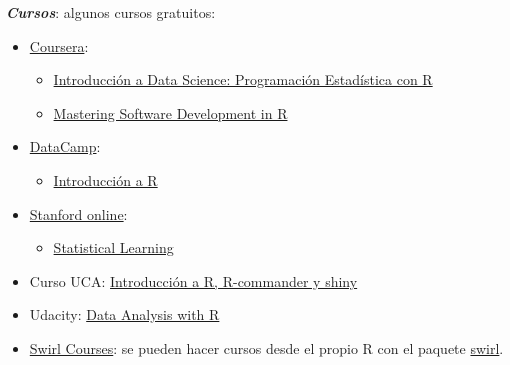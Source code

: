 \documentclass[]{book}
\providecommand{\tightlist}{%
  \setlength{\itemsep}{0pt}\setlength{\parskip}{0pt}}
\begin{document}
\textbf{\emph{Cursos}}: algunos cursos gratuitos:

\begin{itemize}
\item
  \href{https://www.coursera.org/}{Coursera}:

  \begin{itemize}
  \item
    \href{https://www.coursera.org/learn/intro-data-science-programacion-estadistica-r}{Introducción
    a Data Science: Programación Estadística con R}
  \item
    \href{https://www.coursera.org/specializations/r}{Mastering Software
    Development in R}
  \end{itemize}
\end{itemize}

\begin{itemize}
\item
  \href{https://www.datacamp.com/courses}{DataCamp}:

  \begin{itemize}
  \tightlist
  \item
    \href{https://www.datacamp.com/courses/introduccion-a-r/}{Introducción
    a R}
  \end{itemize}
\end{itemize}

\begin{itemize}
\item
  \href{http://online.stanford.edu/courses}{Stanford online}:

  \begin{itemize}
  \tightlist
  \item
    \href{http://online.stanford.edu/course/statistical-learning}{Statistical
    Learning}
  \end{itemize}
\end{itemize}

\begin{itemize}
\tightlist
\item
  Curso UCA:
  \href{http://knuth.uca.es/moodle/course/view.php?id=51}{Introducción a
  R, R-commander y shiny}
\end{itemize}

\begin{itemize}
\tightlist
\item
  Udacity:
  \href{https://eu.udacity.com/course/data-analysis-with-r--ud651}{Data
  Analysis with R}
\end{itemize}

\begin{itemize}
\tightlist
\item
  \href{https://swirlstats.com/scn/title.html}{Swirl Courses}: se pueden
  hacer cursos desde el propio R con el paquete
  \href{https://swirlstats.com}{swirl}.
\end{itemize}
\end{document}
